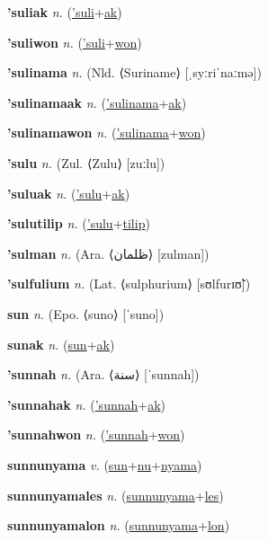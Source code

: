 \textbf{\hypertarget{'suliak}{'suliak}} \textit{n.} (\hyperlink{'suli}{'suli}+\allowbreak \hyperlink{ak}{ak})


\textbf{\hypertarget{'suliwon}{'suliwon}} \textit{n.} (\hyperlink{'suli}{'suli}+\allowbreak \hyperlink{won}{won})


\textbf{\hypertarget{'sulinama}{'sulinama}} \textit{n.} (Nld. ⟨Suriname⟩ [ˌsyːriˈnaːmə])


\textbf{\hypertarget{'sulinamaak}{'sulinamaak}} \textit{n.} (\hyperlink{'sulinama}{'sulinama}+\allowbreak \hyperlink{ak}{ak})


\textbf{\hypertarget{'sulinamawon}{'sulinamawon}} \textit{n.} (\hyperlink{'sulinama}{'sulinama}+\allowbreak \hyperlink{won}{won})


\textbf{\hypertarget{'sulu}{'sulu}} \textit{n.} (Zul. ⟨Zulu⟩ [zuːlu])


\textbf{\hypertarget{'suluak}{'suluak}} \textit{n.} (\hyperlink{'sulu}{'sulu}+\allowbreak \hyperlink{ak}{ak})


\textbf{\hypertarget{'sulutilip}{'sulutilip}} \textit{n.} (\hyperlink{'sulu}{'sulu}+\allowbreak \hyperlink{tilip}{tilip})


\textbf{\hypertarget{'sulman}{'sulman}} \textit{n.} (Ara. ⟨{\arabics{}ظلمان}⟩ [zulman])


\textbf{\hypertarget{'sulfulium}{'sulfulium}} \textit{n.} (Lat. ⟨sulphurium⟩ [sʊlfurɪʊ̃])


\textbf{\hypertarget{sun}{sun}} \textit{n.} (Epo. ⟨suno⟩ [ˈsuno])


\textbf{\hypertarget{sunak}{sunak}} \textit{n.} (\hyperlink{sun}{sun}+\allowbreak \hyperlink{ak}{ak})


\textbf{\hypertarget{'sunnah}{'sunnah}} \textit{n.} (Ara. ⟨{\arabics{}سنة}⟩ [ˈsunnah])


\textbf{\hypertarget{'sunnahak}{'sunnahak}} \textit{n.} (\hyperlink{'sunnah}{'sunnah}+\allowbreak \hyperlink{ak}{ak})


\textbf{\hypertarget{'sunnahwon}{'sunnahwon}} \textit{n.} (\hyperlink{'sunnah}{'sunnah}+\allowbreak \hyperlink{won}{won})


\textbf{\hypertarget{sunnunyama}{sunnunyama}} \textit{v.} (\hyperlink{sun}{sun}+\allowbreak \hyperlink{nu}{nu}+\allowbreak \hyperlink{nyama}{nyama})


\textbf{\hypertarget{sunnunyamales}{sunnunyamales}} \textit{n.} (\hyperlink{sunnunyama}{sunnunyama}+\allowbreak \hyperlink{les}{les})


\textbf{\hypertarget{sunnunyamalon}{sunnunyamalon}} \textit{n.} (\hyperlink{sunnunyama}{sunnunyama}+\allowbreak \hyperlink{lon}{lon})


